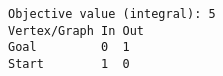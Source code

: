 \begin{verbatim}
Objective value (integral): 5
Vertex/Graph In Out 
Goal         0  1   
Start        1  0   
\end{verbatim}
